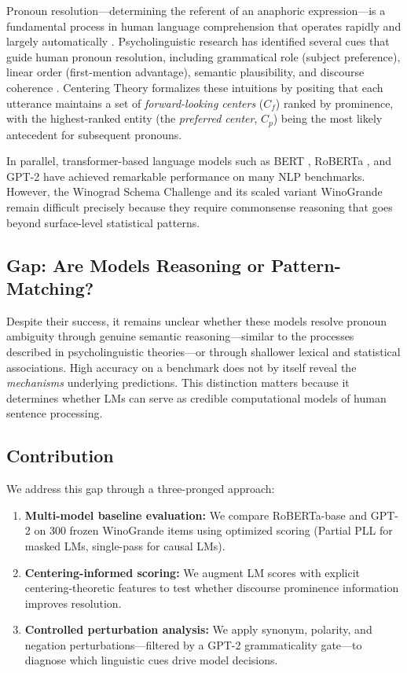 \documentclass[11pt]{article}
\begin{document}
Pronoun resolution---determining the referent of an anaphoric expression---is a fundamental process in human language comprehension that operates rapidly and largely automatically \citep{traxler2012}. Psycholinguistic research has identified several cues that guide human pronoun resolution, including grammatical role (subject preference), linear order (first-mention advantage), semantic plausibility, and discourse coherence \citep{grosz1995}. Centering Theory \citep{grosz1995} formalizes these intuitions by positing that each utterance maintains a set of \emph{forward-looking centers} ($C_f$) ranked by prominence, with the highest-ranked entity (the \emph{preferred center}, $C_p$) being the most likely antecedent for subsequent pronouns.

In parallel, transformer-based language models such as BERT \citep{devlin2019}, RoBERTa \citep{liu2019}, and GPT-2 \citep{radford2019} have achieved remarkable performance on many NLP benchmarks. However, the Winograd Schema Challenge \citep{levesque2012} and its scaled variant WinoGrande \citep{sakaguchi2019} remain difficult precisely because they require commonsense reasoning that goes beyond surface-level statistical patterns.

\subsection{Gap: Are Models Reasoning or Pattern-Matching?}

Despite their success, it remains unclear whether these models resolve pronoun ambiguity through genuine semantic reasoning---similar to the processes described in psycholinguistic theories---or through shallower lexical and statistical associations. High accuracy on a benchmark does not by itself reveal the \emph{mechanisms} underlying predictions. This distinction matters because it determines whether LMs can serve as credible computational models of human sentence processing.

\subsection{Contribution}

We address this gap through a three-pronged approach:
\begin{enumerate}[leftmargin=*]
    \item \textbf{Multi-model baseline evaluation:} We compare RoBERTa-base and GPT-2 on 300 frozen WinoGrande items using optimized scoring (Partial PLL for masked LMs, single-pass for causal LMs).
    \item \textbf{Centering-informed scoring:} We augment LM scores with explicit centering-theoretic features to test whether discourse prominence information improves resolution.
    \item \textbf{Controlled perturbation analysis:} We apply synonym, polarity, and negation perturbations---filtered by a GPT-2 grammaticality gate---to diagnose which linguistic cues drive model decisions.
\end{enumerate}
\end{document}
